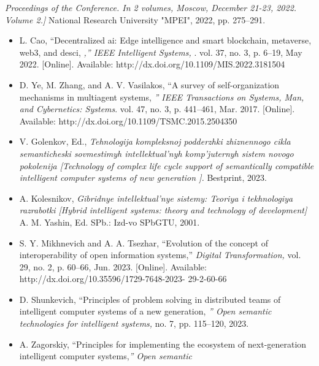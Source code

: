 \begin{multicols}{2}

 \footnotesize%
 
\noindent
\leftskip=8mm 
\textit {Proceedings of the Conference. In 2 volumes, Moscow, December
21-23, 2022. Volume 2.]} National Research University "MPEI", 2022, pp. 275–291.

\begin{itemize}
  \renewcommand{\labelitemi}{[2]}
  \item L. Cao, “Decentralized ai: Edge intelligence and smart
blockchain, metaverse, web3, and desci,
 \textit{,” IEEE Intelligent Systems, }. vol. 37, no. 3, p. 6–19, May 2022. [Online]. Available:
http://dx.doi.org/10.1109/MIS.2022.3181504
\renewcommand{\labelitemi}{[3]}
		\item D. Ye, M. Zhang, and A. V. Vasilakos, “A survey of
self-organization mechanisms in multiagent systems,  \textit{” IEEE
Transactions on Systems, Man, and Cybernetics: Systems}. vol. 47, no. 3, p. 441–461, Mar. 2017. [Online]. Available:
http://dx.doi.org/10.1109/TSMC.2015.2504350
\renewcommand{\labelitemi}{[4]}	
\item   V. Golenkov, Ed.,\textit{ Tehnologija kompleksnoj podderzhki
zhiznennogo cikla semanticheski sovmestimyh intellektual’nyh
komp’juternyh sistem novogo pokolenija [Technology of complex
life cycle support of semantically compatible intelligent computer
systems of new generation ].} Bestprint, 2023.
\renewcommand{\labelitemi}{[5]}
\item  A. Kolesnikov, \textit{Gibridnye intellektual’nye sistemy: Teoriya i
tekhnologiya razrabotki [Hybrid intelligent systems: theory and
technology of development]} A. M. Yashin, Ed. SPb.: Izd-vo
SPbGTU, 2001.
\renewcommand{\labelitemi}{[6]}
\item S. Y. Mikhnevich and A. A. Tsezhar, “Evolution of the
concept of interoperability of open information systems,”
\textit{Digital Transformation,} vol. 29, no. 2, p. 60–66, Jun. 2023.
[Online]. Available: http://dx.doi.org/10.35596/1729-7648-2023-
29-2-60-66
\renewcommand{\labelitemi}{[7]}
\item  D. Shunkevich, “Principles of problem solving in distributed
teams of intelligent computer systems of a new generation, \textit{” Open
semantic technologies for intelligent systems, } no. 7, pp. 115–120,
2023.
\renewcommand{\labelitemi}{[8]}
\item A. Zagorskiy, “Principles for implementing the ecosystem of
next-generation intelligent computer systems,\textit{” Open semantic
}
\end{itemize}
\end{multicols}
